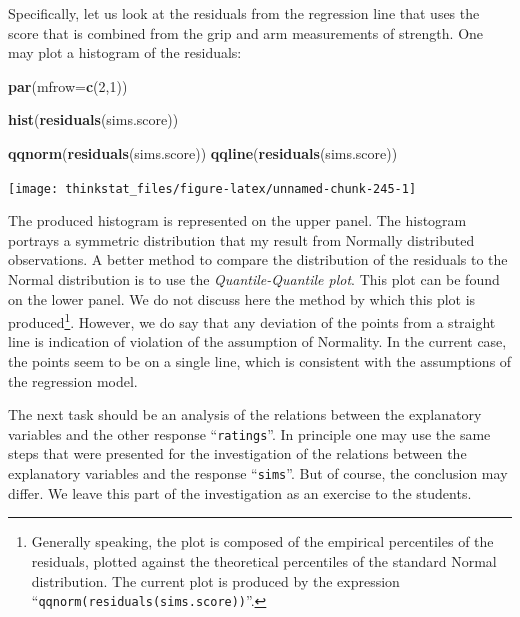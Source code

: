 \documentclass[]{krantz}
\makeatletter
\newenvironment{Shaded}{\begin{snugshade}}{\end{snugshade}}
\newcommand{\KeywordTok}[1]{\textcolor[rgb]{0.13,0.29,0.53}{\textbf{#1}}}
\newcommand{\DataTypeTok}[1]{\textcolor[rgb]{0.13,0.29,0.53}{#1}}
\newcommand{\DecValTok}[1]{\textcolor[rgb]{0.00,0.00,0.81}{#1}}
\newcommand{\NormalTok}[1]{#1}
\newenvironment{kframe}{%
\medskip{}
\setlength{\fboxsep}{.8em}
 \def\at@end@of@kframe{}%
 \ifinner\ifhmode%
  \def\at@end@of@kframe{\end{minipage}}%
  \begin{minipage}{\columnwidth}%
 \fi\fi%
 \def\FrameCommand##1{\hskip\@totalleftmargin \hskip-\fboxsep
 \colorbox{shadecolor}{##1}\hskip-\fboxsep
     \hskip-\linewidth \hskip-\@totalleftmargin \hskip\columnwidth}%
 \MakeFramed {\advance\hsize-\width
   \@totalleftmargin\z@ \linewidth\hsize
   \@setminipage}}%
 {\par\unskip\endMakeFramed%
 \at@end@of@kframe}
\renewenvironment{Shaded}{\begin{kframe}}{\end{kframe}}
\theoremstyle{definition}
\theoremstyle{definition}
\theoremstyle{definition}
\theoremstyle{remark}
\makeatother
\begin{document}
Specifically, let us look at the residuals from the regression line that
uses the score that is combined from the grip and arm measurements of
strength. One may plot a histogram of the residuals:

\begin{Shaded}
\begin{Highlighting}[]
\KeywordTok{par}\NormalTok{(}\DataTypeTok{mfrow=}\KeywordTok{c}\NormalTok{(}\DecValTok{2}\NormalTok{,}\DecValTok{1}\NormalTok{))}

\KeywordTok{hist}\NormalTok{(}\KeywordTok{residuals}\NormalTok{(sims.score))}

\KeywordTok{qqnorm}\NormalTok{(}\KeywordTok{residuals}\NormalTok{(sims.score))}
\KeywordTok{qqline}\NormalTok{(}\KeywordTok{residuals}\NormalTok{(sims.score))}
\end{Highlighting}
\end{Shaded}

\begin{center}\texttt{[image: thinkstat\_files/figure-latex/unnamed-chunk-245-1]} \end{center}

The produced histogram is represented on the upper panel. The histogram
portrays a symmetric distribution that my result from Normally
distributed observations. A better method to compare the distribution of
the residuals to the Normal distribution is to use the
\emph{Quantile-Quantile plot}. This plot can be found on the lower
panel. We do not discuss here the method by which this plot is
produced\footnote{Generally speaking, the plot is composed of the
  empirical percentiles of the residuals, plotted against the
  theoretical percentiles of the standard Normal distribution. The
  current plot is produced by the expression
  ``\texttt{qqnorm(residuals(sims.score))}''.}. However, we do say that
any deviation of the points from a straight line is indication of
violation of the assumption of Normality. In the current case, the
points seem to be on a single line, which is consistent with the
assumptions of the regression model.

The next task should be an analysis of the relations between the
explanatory variables and the other response ``\texttt{ratings}''. In
principle one may use the same steps that were presented for the
investigation of the relations between the explanatory variables and the
response ``\texttt{sims}''. But of course, the conclusion may differ. We
leave this part of the investigation as an exercise to the students.
\end{document}
